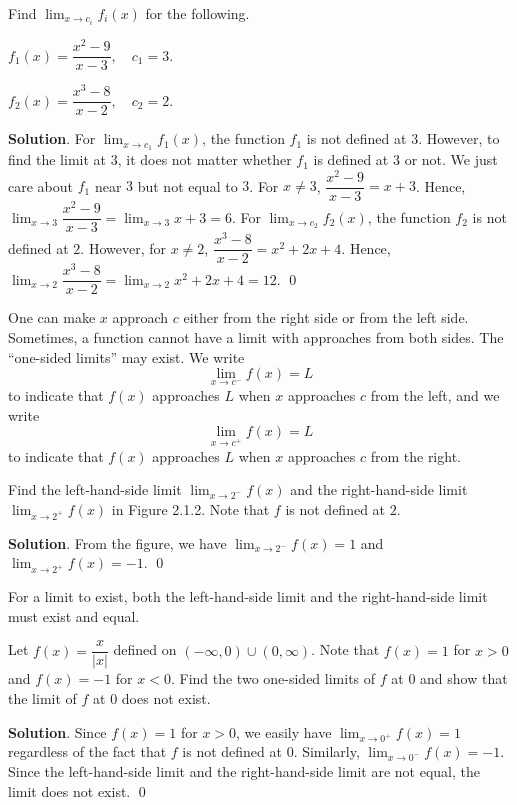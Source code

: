 \documentclass[11pt]{book}
\begin{document}
\begin{example}
    Find $\displaystyle\lim_{x\to c_i}f_i(x)$ for the following.
    \begin{enumerate}
        \vspace{-0.9em}
        \begin{multicols}{2}
            \item $f_1(x)=\dfrac{x^2-9}{x-3}, \quad c_1=3$.
            \item $f_2(x)=\dfrac{x^3-8}{x-2}, \quad c_2=2$.
        \end{multicols}
        \vspace{0.1em}
    \end{enumerate}
\end{example}
\textbf{Solution}. For $\displaystyle\lim_{x\to c_1}f_1(x)$, the function $f_1$ is not defined at $3$. However, to find the limit at $3$, it does not matter whether $f_1$ is defined at $3$ or not. We just care about $f_1$ near $3$ but not equal to $3$. For $x\ne 3$, $\dfrac{x^2-9}{x-3}=x+3$. Hence, $\displaystyle\lim_{x\to 3}\dfrac{x^2-9}{x-3}=\lim_{x\to 3}x+3=6$. For $\displaystyle\lim_{x\to c_2}f_2(x)$, the function $f_2$ is not defined at $2$. However, for $x\ne 2$, $\dfrac{x^3-8}{x-2}=x^2+2x+4$. Hence, $\displaystyle\lim_{x\to 2}\dfrac{x^3-8}{x-2}=\lim_{x\to 2}x^2+2x+4=12$. \qed

One can make $x$ approach $c$ either from the right side or from the left side. Sometimes, a function cannot have a limit with approaches from both sides. The ``one-sided limits'' may exist. We write $$\lim_{x\to c^-}f(x)=L$$ to indicate that $f(x)$ approaches $L$ when $x$ approaches $c$ from the left, and we write $$\lim_{x\to c^+}f(x)=L$$ to indicate that $f(x)$ approaches $L$ when $x$ approaches $c$ from the right.

\begin{example}
    Find the left-hand-side limit $\displaystyle\lim_{x\to 2^-}f(x)$ and the right-hand-side limit $\displaystyle\lim_{x\to 2^+}f(x)$ in Figure 2.1.2. Note that $f$ is not defined at $2$.
\end{example}
\textbf{Solution}. From the figure, we have $\displaystyle\lim_{x\to 2^-}f(x)=1$ and $\displaystyle\lim_{x\to 2^+}f(x)=-1$. \qed

For a limit to exist, both the left-hand-side limit and the right-hand-side limit must exist and equal.

\begin{example}
    Let $f(x)=\dfrac{x}{|x|}$ defined on $(-\infty, 0)\cup(0, \infty)$. Note that $f(x)=1$ for $x>0$ and $f(x)=-1$ for $x<0$. Find the two one-sided limits of $f$ at $0$ and show that the limit of $f$ at $0$ does not exist.
\end{example}
\textbf{Solution}. Since $f(x)=1$ for $x>0$, we easily have $\displaystyle\lim_{x\to 0^+}f(x)=1$ regardless of the fact that $f$ is not defined at $0$. Similarly, $\displaystyle\lim_{x\to 0^-}f(x)=-1$. Since the left-hand-side limit and the right-hand-side limit are not equal, the limit does not exist. \qed
\end{document}
